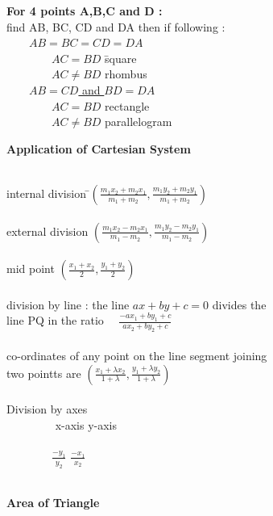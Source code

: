 \documentclass[11pt,a4paper,landscape]{article}
\begin{document}
\begin{multicols*}{3}
\begin{tabbing}
{\bfseries  For 4 points A,B,C and D :} \\
find AB, BC, CD and DA then if following :\\
$\qquad $\underline{$AB = BC = CD = DA$} \\
$\qquad \qquad  AC = BD$ \hspace{20mm} \= square\\
$\qquad \qquad AC \neq BD$ \> rhombus\\

$\qquad $\underline{$AB = CD$ and $BD = DA$} \\
$\qquad \qquad  AC = BD$ \> rectangle\\
$\qquad \qquad AC \neq BD$ \> parallelogram\\
\end{tabbing}
{\bfseries{\Large Application of Cartesian System}}\\ \\
\begin{tabbing}
internal division \hspace{3mm} \=$\left ( \frac{m_1 x_2 + m_2 x_1}{m_1+ m_2}, \frac{m_1 y_2 + m_2 y_1}{m_1+ m_2} \right )$\\ \\
external division \> $\left ( \frac{m_1 x_2 - m_2 x_1}{m_1- m_2}, \frac{m_1 y_2 - m_2 y_1}{m_1- m_2} \right )$\\ \\
mid point \> $\left ( \frac{ x_1+ x_2}{2}, \frac{y_1 +  y_2}{2} \right )$\\ \\
division by line : the line $ax+by+c=0$ divides the\\ line PQ in the ratio \> $\quad \frac{-ax_1+by_1+c}{ax_2+by_2+c}$ \\ \\
co-ordinates of any point on the line segment joining\\ two pointts are \>$\left ( \frac{ x_1+ \lambda x_2}{1+\lambda}, \frac{y_1 +  \lambda y_2}{1+\lambda} \right )$\\ \\
Division by axes\\
$\qquad \qquad$ x-axis \>  y-axis\\\\
$\qquad \qquad\frac{-y_1}{y_2}$ \> $\frac{-x_1}{x_2}$\\ \\
\end{tabbing}
\vfill\null
\columnbreak
%
%
%
{\bfseries{\Large Area of Triangle}}\\ \\

\end{multicols*}
\end{document}
